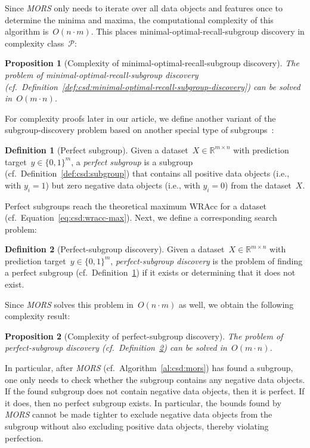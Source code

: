 \documentclass{article}
\newtheorem{proposition}{Proposition}
\theoremstyle{definition}
\newtheorem{definition}{Definition}
\begin{document}
Since \emph{MORS} only needs to iterate over all data objects and features once to determine the minima and maxima, the computational complexity of this algorithm is~$O(n \cdot m)$.
This places minimal-optimal-recall-subgroup discovery in complexity class~$\mathcal{P}$:
%
\begin{proposition}[Complexity of minimal-optimal-recall-subgroup discovery]
	The problem of minimal-optimal-recall-subgroup discovery (cf.~Definition~\ref{def:csd:minimal-optimal-recall-subgroup-discovery}) can be solved in~$O(m \cdot n)$.
	\label{prop:csd:complexity-unconstrained-minimal-optimal-recall-subgroup-discovery}
\end{proposition}

For complexity proofs later in our article, we define another variant of the subgroup-discovery problem based on another special type of subgroups~\cite{meeng2014rocsearch}:
%
\begin{definition}[Perfect subgroup]
	Given a dataset~$X \in \mathbb{R}^{m \times n}$ with prediction target~$y \in \{0, 1\}^m$,
	a \emph{perfect subgroup} is a subgroup (cf.~Definition~\ref{def:csd:subgroup}) that contains all positive data objects (i.e., with $y_i = 1$) but zero negative data objects (i.e., with $y_i = 0$) from the dataset~$X$.
	\label{def:csd:perfect-subgroup}
\end{definition}
%
Perfect subgroups reach the theoretical maximum WRAcc for a dataset (cf.~Equation~\ref{eq:csd:wracc-max}).
Next, we define a corresponding search problem:
%
\begin{definition}[Perfect-subgroup discovery]
	Given a dataset~$X \in \mathbb{R}^{m \times n}$ with prediction target~$y \in \{0, 1\}^m$,
	\emph{perfect-subgroup discovery} is the problem of finding a perfect subgroup (cf.~Definition~\ref{def:csd:perfect-subgroup}) if it exists or determining that it does not exist.
	\label{def:csd:perfect-subgroup-discovery}
\end{definition}
%
Since \emph{MORS} solves this problem in~$O(n \cdot m)$ as well, we obtain the following complexity result:
%
\begin{proposition}[Complexity of perfect-subgroup discovery]
	The problem of perfect-subgroup discovery (cf.~Definition~\ref{def:csd:perfect-subgroup-discovery}) can be solved in~$O(m \cdot n)$.
	\label{prop:csd:complexity-unconstrained-perfect-subgroup}
\end{proposition}
%
In particular, after \emph{MORS} (cf.~Algorithm~\ref{al:csd:mors}) has found a subgroup, one only needs to check whether the subgroup contains any negative data objects.
If the found subgroup does not contain negative data objects, then it is perfect.
If it does, then no perfect subgroup exists.
In particular, the bounds found by \emph{MORS} cannot be made tighter to exclude negative data objects from the subgroup without also excluding positive data objects, thereby violating perfection.
\end{document}
